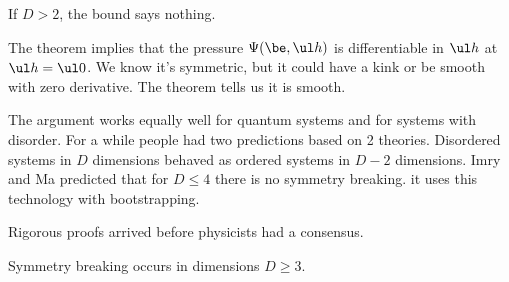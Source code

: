 If $D>2$, the bound says nothing.


The theorem implies that the pressure $\Psi(\be, \ul h)$ is differentiable in $\ul h$ at $\ul h = \ul 0$. We know it's symmetric, but it could have a kink or be smooth with zero derivative. The theorem tells us it is smooth.

The argument works equally well for quantum systems and for systems with disorder. For a while people had two predictions based on 2 theories. Disordered systems in $D$ dimensions behaved as ordered systems in $D-2$ dimensions. Imry and Ma predicted that for $D\le 4$ there is no symmetry breaking. it uses this technology with bootstrapping.

Rigorous proofs arrived before physicists had a consensus.
%

Symmetry breaking occurs in dimensions $D\ge 3$. %

